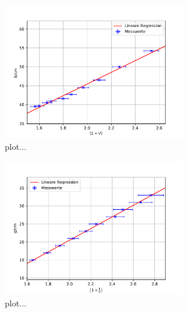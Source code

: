 \begin{figure}
  \centering
  \includegraphics[width = 0.7\textwidth]{../Messdaten/plots/abbe_plot_b.pdf}
  \caption{plot...}
  \label{fig: abbe_b}
\end{figure}

\begin{figure}
  \centering
  \includegraphics[width = 0.7\textwidth]{../Messdaten/plots/abbe_plot_g.pdf}
  \caption{plot...}
  \label{fig: abbe_g}
\end{figure}


